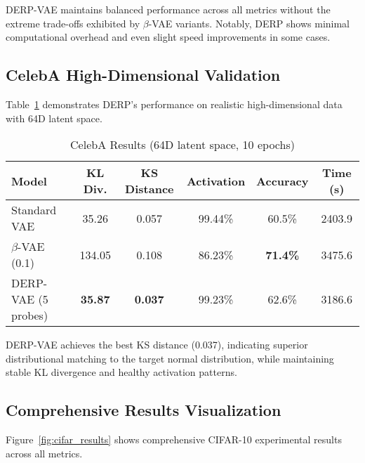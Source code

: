 \documentclass[11pt]{article}
\begin{document}
DERP-VAE maintains balanced performance across all metrics without the extreme trade-offs exhibited by $\beta$-VAE variants. Notably, DERP shows minimal computational overhead and even slight speed improvements in some cases.

\subsection{CelebA High-Dimensional Validation}

Table~\ref{tab:celeba_results} demonstrates DERP's performance on realistic high-dimensional data with 64D latent space.

\begin{table}[ht]
\centering
\caption{CelebA Results (64D latent space, 10 epochs)}
\label{tab:celeba_results}
\begin{tabular}{@{}lccccc@{}}
\toprule
\textbf{Model} & \textbf{KL Div.} & \textbf{KS Distance} & \textbf{Activation} & \textbf{Accuracy} & \textbf{Time (s)} \\
\midrule
Standard VAE & 35.26 & 0.057 & 99.44\% & 60.5\% & 2403.9 \\
$\beta$-VAE (0.1) & 134.05 & 0.108 & 86.23\% & \textbf{71.4\%} & 3475.6 \\
DERP-VAE (5 probes) & \textbf{35.87} & \textbf{0.037} & 99.23\% & 62.6\% & 3186.6 \\
\bottomrule
\end{tabular}
\end{table}

DERP-VAE achieves the best KS distance (0.037), indicating superior distributional matching to the target normal distribution, while maintaining stable KL divergence and healthy activation patterns.

\subsection{Comprehensive Results Visualization}

Figure~\ref{fig:cifar_results} shows comprehensive CIFAR-10 experimental results across all metrics.

\end{document}
